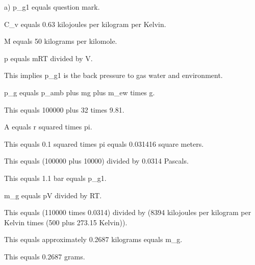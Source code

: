 a) p_g1 equals question mark.

C_v equals 0.63 kilojoules per kilogram per Kelvin.

M equals 50 kilograms per kilomole.

p equals mRT divided by V.

This implies p_g1 is the back pressure to gas water and environment.

p_g equals p_amb plus mg plus m_ew times g.

This equals 100000 plus 32 times 9.81.

A equals r squared times pi.

This equals 0.1 squared times pi equals 0.031416 square meters.

This equals (100000 plus 10000) divided by 0.0314 Pascals.

This equals 1.1 bar equals p_g1.

m_g equals pV divided by RT.

This equals (110000 times 0.0314) divided by (8394 kilojoules per kilogram per Kelvin times (500 plus 273.15 Kelvin)).

This equals approximately 0.2687 kilograms equals m_g.

This equals 0.2687 grams.